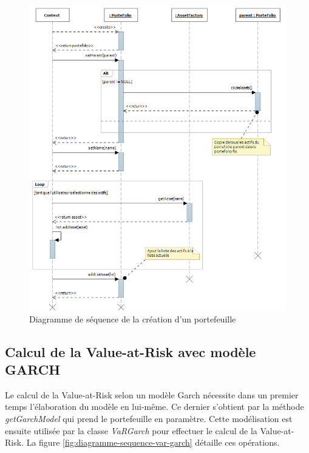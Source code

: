 \documentclass[a4paper]{report}
\begin{document}
\begin{figure}
  	\center
  	\includegraphics[width=1\textwidth]{diagSeqPortefolio.png}
  	\caption{Diagramme de séquence de la création d'un portefeuille}
    \label{fig:diagramme-sequence-creation-portefeuille}
\end{figure}


\subsection{Calcul de la Value-at-Risk avec modèle GARCH}

Le calcul de la Value-at-Risk selon un modèle Garch nécessite dans un premier temps l'élaboration du modèle en lui-même.
Ce dernier s'obtient par la méthode \textit{getGarchModel} qui prend le portefeuille en paramètre.
Cette modélisation est ensuite utilisée par la classe \textit{VaRGarch} pour effectuer le calcul de la Value-at-Risk.
La figure \ref{fig:diagramme-sequence-var-garch} détaille ces opérations.
\end{document}
